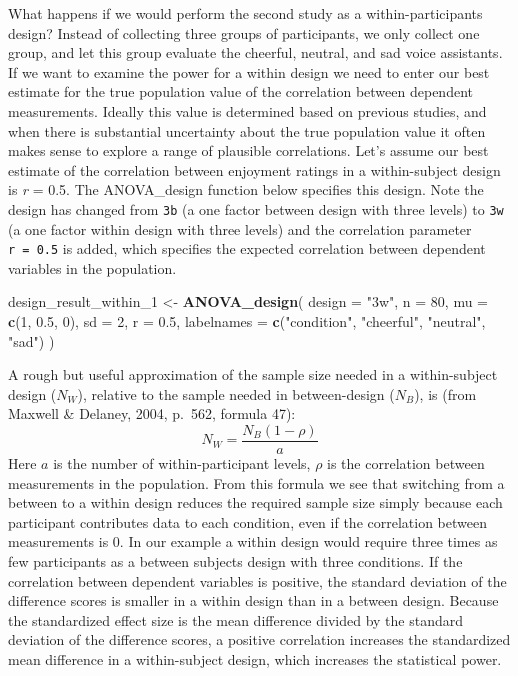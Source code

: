 \documentclass[,man,floatsintext]{apa6}
\newenvironment{Shaded}{\begin{snugshade}}{\end{snugshade}}
\newcommand{\DataTypeTok}[1]{\textcolor[rgb]{0.13,0.29,0.53}{#1}}
\newcommand{\DecValTok}[1]{\textcolor[rgb]{0.00,0.00,0.81}{#1}}
\newcommand{\FloatTok}[1]{\textcolor[rgb]{0.00,0.00,0.81}{#1}}
\newcommand{\KeywordTok}[1]{\textcolor[rgb]{0.13,0.29,0.53}{\textbf{#1}}}
\newcommand{\NormalTok}[1]{#1}
\newcommand{\StringTok}[1]{\textcolor[rgb]{0.31,0.60,0.02}{#1}}
\begin{document}
What happens if we would perform the second study as a within-participants design?
Instead of collecting three groups of participants, we only collect one group, and let this group evaluate the cheerful, neutral, and sad voice assistants.
If we want to examine the power for a within design we need to enter our best estimate for the true population value of the correlation between dependent measurements.
Ideally this value is determined based on previous studies, and when there is substantial uncertainty about the true population value it often makes sense to explore a range of plausible correlations.
Let's assume our best estimate of the correlation between enjoyment ratings in a within-subject design is \emph{r} = 0.5.
The ANOVA\_design function below specifies this design.
Note the design has changed from \texttt{3b} (a one factor between design with three levels) to \texttt{3w} (a one factor within design with three levels) and the correlation parameter \texttt{r\ =\ 0.5} is added, which specifies the expected correlation between dependent variables in the population.

\begin{Shaded}
\begin{Highlighting}[]
\NormalTok{design_result_within_}\DecValTok{1}\NormalTok{ <-}\StringTok{ }\KeywordTok{ANOVA_design}\NormalTok{(}
  \DataTypeTok{design =} \StringTok{"3w"}\NormalTok{,}
  \DataTypeTok{n =} \DecValTok{80}\NormalTok{,}
  \DataTypeTok{mu =} \KeywordTok{c}\NormalTok{(}\DecValTok{1}\NormalTok{, }\FloatTok{0.5}\NormalTok{, }\DecValTok{0}\NormalTok{),}
  \DataTypeTok{sd =} \DecValTok{2}\NormalTok{,}
  \DataTypeTok{r =} \FloatTok{0.5}\NormalTok{,}
  \DataTypeTok{labelnames =} \KeywordTok{c}\NormalTok{(}\StringTok{"condition"}\NormalTok{, }\StringTok{"cheerful"}\NormalTok{, }\StringTok{"neutral"}\NormalTok{, }\StringTok{"sad"}\NormalTok{)}
\NormalTok{)}
\end{Highlighting}
\end{Shaded}

A rough but useful approximation of the sample size needed in a within-subject design (\(N_W\)), relative to the sample needed in between-design (\(N_B\)), is (from Maxwell \& Delaney, 2004, p.~562, formula 47):
\begin{equation}
N_{W}=\frac{N_{B}(1-\rho)}{a} \label{eq:within-n}
\end{equation}
Here \(a\) is the number of within-participant levels, \(\rho\) is the correlation between measurements in the population.
From this formula we see that switching from a between to a within design reduces the required sample size simply because each participant contributes data to each condition, even if the correlation between measurements is 0.
In our example a within design would require three times as few participants as a between subjects design with three conditions.
If the correlation between dependent variables is positive, the standard deviation of the difference scores is smaller in a within design than in a between design.
Because the standardized effect size is the mean difference divided by the standard deviation of the difference scores, a positive correlation increases the standardized mean difference in a within-subject design, which increases the statistical power.
\end{document}
